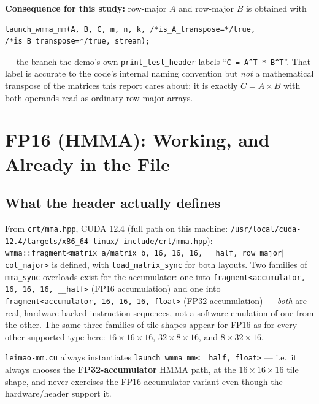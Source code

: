 \documentclass[11pt]{article}
\begin{document}
\textbf{Consequence for this study:} row-major $A$ and row-major $B$ is obtained with
\begin{lstlisting}
launch_wmma_mm(A, B, C, m, n, k, /*is_A_transpose=*/true, /*is_B_transpose=*/true, stream);
\end{lstlisting}
--- the branch the demo's own \texttt{print\_test\_header} labels ``\texttt{C = A\^{}T *
B\^{}T}''. That label is accurate to the code's internal naming convention but
\emph{not} a mathematical transpose of the matrices this report cares about: it is
exactly $C = A \times B$ with both operands read as ordinary row-major arrays.

\section{FP16 (HMMA): Working, and Already in the File}
\label{sec:fp16}

\subsection{What the header actually defines}
From \texttt{crt/mma.hpp}, CUDA 12.4 (full path on this machine:
\texttt{/usr/local/cuda-12.4/targets/\allowbreak x86\_64-linux/\allowbreak
include/crt/mma.hpp}): \texttt{wmma::fragment<matrix\_a/matrix\_b, 16, 16,
16, \_\_half, row\_major$|$col\_major>} is defined, with \texttt{load\_matrix\_sync} for
both layouts. Two families of \texttt{mma\_sync} overloads exist for the accumulator:
one into \texttt{fragment<accumulator, 16, 16, 16, \_\_half>} (FP16 accumulation) and one
into \texttt{fragment<accumulator, 16, 16, 16, float>} (FP32 accumulation) --- \emph{both}
are real, hardware-backed instruction sequences, not a software emulation of one from the
other. The same three families of tile shapes appear for FP16 as for every other
supported type here: $16\!\times\!16\!\times\!16$, $32\!\times\!8\!\times\!16$, and
$8\!\times\!32\!\times\!16$.

\texttt{leimao-mm.cu} always instantiates \texttt{launch\_wmma\_mm<\_\_half, float>} ---
i.e.\ it always chooses the \textbf{FP32-accumulator} HMMA path, at the
$16\times16\times16$ tile shape, and never exercises the FP16-accumulator variant even
though the hardware/header support it.
\end{document}
